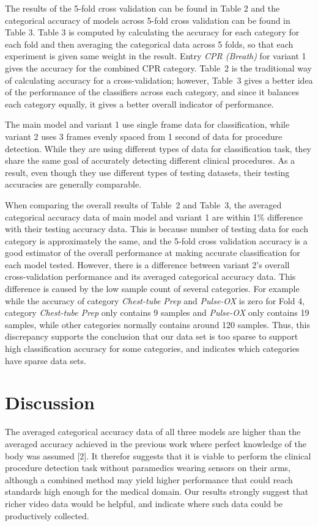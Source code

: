 \documentclass[letterpaper, 10 pt, conference]{ieeeconf}  %
\begin{document}
The results of the 5-fold cross validation can be found in Table 2 and the  categorical accuracy of models across 5-fold cross validation can be found in Table 3. Table 3 is computed by calculating the accuracy for each category for each fold and then averaging the categorical data across 5 folds, so that each experiment is given same weight in the result. Entry \textit{CPR (Breath)} for variant 1 gives the accuracy for the combined CPR category.  Table~2 is the traditional way of calculating accuracy for a cross-validation; however, Table~3 gives a better idea of the performance of the classifiers across each category, and since it balances each category equally, it gives a better overall indicator of performance.

The main model and variant 1 use single frame data for classification, while variant 2 uses 3 frames evenly spaced from 1 second of data for procedure detection. While they are using different types of data for classification task, they share the same goal of accurately detecting different clinical procedures. As a result, even though they use different types of testing datasets, their testing accuracies are generally comparable. 

When comparing the overall results of Table~2 and Table~3, the averaged  categorical accuracy data of main model and variant 1 are within 1\% difference with their testing accuracy data. This is because number of testing data for each category is approximately the same, and the 5-fold cross validation accuracy is a good estimator of the overall performance at making accurate classification for each model tested.  
However, there is a difference between variant 2's overall cross-validation performance and its averaged  categorical accuracy data. This difference is caused by the low sample count of several categories. For example while the accuracy of category \textit{Chest-tube Prep} and \textit{Pulse-OX} is zero for Fold 4, category \textit{Chest-tube Prep} only contains 9 samples and \textit{Pulse-OX} only contains 19 samples, while other categories normally contains around 120 samples.  Thus, this discrepancy supports the conclusion that our data set is too sparse to support high classification accuracy for some categories, and indicates which categories have sparse data sets.

\section{Discussion}
The averaged categorical accuracy data of all three models are higher than the averaged accuracy achieved in the previous work where perfect knowledge of the body was assumed [2].
It therefor suggests that it is viable to perform the clinical procedure detection task without paramedics wearing sensors on their arms, although a combined method may yield higher performance that could reach standards high enough for the medical domain. Our results strongly suggest that richer video data would be helpful, and indicate where such data could be productively collected.
\end{document}

